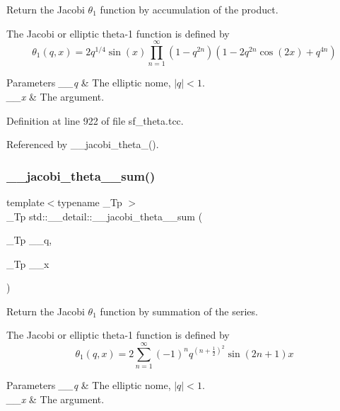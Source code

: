 Return the Jacobi $ \theta_1 $ function by accumulation of the product.

The Jacobi or elliptic theta-\/1 function is defined by \[ \theta_1(q,x) = 2 q^{1/4} \sin(x) \prod_{n=1}^{\infty} (1 - q^{2n})(1 - 2q^{2n}\cos(2x) + q^{4n}) \]


\begin{DoxyParams}{Parameters}
{\em \+\_\+\+\_\+q} & The elliptic nome, $ |q| < 1 $. \\
\hline
{\em \+\_\+\+\_\+x} & The argument. \\
\hline
\end{DoxyParams}


Definition at line 922 of file sf\+\_\+theta.\+tcc.



Referenced by \+\_\+\+\_\+jacobi\+\_\+theta\+\_().

\mbox{\label{namespacestd_1_1____detail_adea964551a6650baebe13574d942bf50}} 
\subsubsection{\texorpdfstring{\+\_\+\+\_\+jacobi\+\_\+theta\+\_\+\_\+sum()}{\_\_jacobi\_theta\_1\_sum()}}
{\footnotesize\ttfamily template$<$typename \+\_\+\+Tp $>$ \\
\+\_\+\+Tp std\+::\+\_\+\+\_\+detail\+::\+\_\+\+\_\+jacobi\+\_\+theta\+\_\+\_\+sum (\begin{DoxyParamCaption}\item[{\+\_\+\+Tp}]{\+\_\+\+\_\+q,  }\item[{\+\_\+\+Tp}]{\+\_\+\+\_\+x }\end{DoxyParamCaption})}

Return the Jacobi $ \theta_1 $ function by summation of the series.

The Jacobi or elliptic theta-\/1 function is defined by \[ \theta_1(q,x) = 2\sum_{n=1}^{\infty}(-1)^n q^{(n+\frac{1}{2})^2}\sin{(2n+1)x} \]


\begin{DoxyParams}{Parameters}
{\em \+\_\+\+\_\+q} & The elliptic nome, $ |q| < 1 $. \\
\hline
{\em \+\_\+\+\_\+x} & The argument. \\
\hline
\end{DoxyParams}


